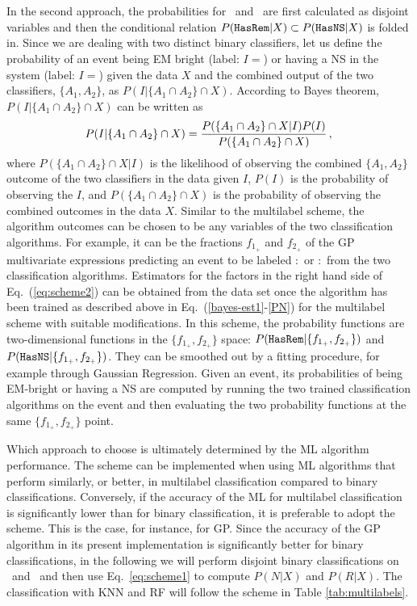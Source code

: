 ~\\\\

In the second approach, the probabilities for \hasns\ and \hasrem\ are first calculated as disjoint variables and then the conditional relation $P({{\tt HasRem}}|X)\subset P({{\tt HasNS}}|X)$ is
folded in. Since we are dealing with two distinct binary classifiers, let us define the probability of an event being \ac{EM} bright (label: $I=$\hasrem) or having a \ac{NS} in the system (label: $I=$\hasns) given the data $X$ and the combined output of the two classifiers, $\{A_1,A_2\}$, as $P(I|\{A_1\cap A_2\}\cap X)$. According to Bayes theorem, $P(I|\{A_1\cap A_2\}\cap X)$ can be written as
%
\begin{equation}
P(I|\{A_1\cap A_2\} \cap X)=\frac{P(\{A_1\cap A_2\}\cap X|I)P(I)}{P(\{A_1\cap A_2\}\cap X)}\,,\\
\label{eq:scheme2}
\end{equation}
%
where $P(\{A_1\cap A_2\}\cap X|I)$ is the likelihood of observing the combined $\{A_1,A_2\}$ outcome of the two classifiers in the data given $I$, $P(I)$ is the probability of observing the $I$, and $P(\{A_1\cap A_2\}\cap X)$ is the probability of observing the combined outcomes in the data $X$. Similar to the multilabel scheme, the algorithm outcomes can be chosen to be any variables of the two classification algorithms. For example, it can be the fractions $f_{1_+}$ and $f_{2_+}$ of the \ac{GP} multivariate expressions predicting an event to be labeled \hasns:\true\ or \hasrem:\true\ from the two classification algorithms. Estimators for the factors in the right hand side of Eq.~(\ref{eq:scheme2}) can be obtained from the data set once the algorithm has been trained as described above in Eq.~(\ref{bayes-est1}-\ref{PN}) for the multilabel scheme with suitable modifications. In this scheme, the probability functions are two-dimensional functions in the $\{f_{1_+},f_{2_+}\}$ space: $P({{\tt HasRem}}|\{f_{1_+},f_{2_+}\})$ and $P({{\tt HasNS}}|\{f_{1_+},f_{2_+}\})$. They can be smoothed out by a fitting procedure, for example through Gaussian Regression. Given an event, its probabilities of being \ac{EM}-bright or having a \ac{NS} are computed by running the two trained classification algorithms on the event and then evaluating the two probability functions at the same $\{f_{1_+},f_{2_+}\}$ point.

Which approach to choose is ultimately determined by the \ac{ML} algorithm performance. The  scheme can be implemented when using \ac{ML} algorithms that perform similarly, or
better, in multilabel classification compared to binary classifications. Conversely, if the accuracy of the \ac{ML} for multilabel classification is significantly lower than for binary
classification, it is preferable to adopt the  scheme. This is the case, for instance, for \ac{GP}. Since the accuracy of the \ac{GP} algorithm in its present implementation is
significantly better for binary classifications, in the following we will perform disjoint binary classifications on \hasns\ and \hasrem\ and then use Eq.~\ref{eq:scheme1} to compute
$P(N|X)$ and $P(R|X)$. The classification with \ac{KNN} and \ac{RF} will follow the scheme in Table \ref{tab:multilabels}. 
